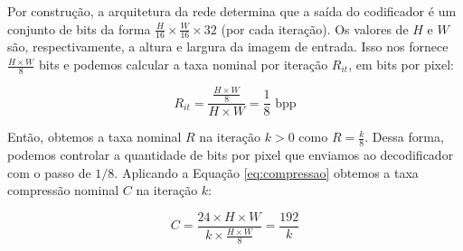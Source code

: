 Por construção, a arquitetura da rede determina que a saída do codificador é um conjunto de bits da forma $\frac{H}{16} \times \frac{W}{16} \times 32$ (por cada iteração). Os valores de $H$ e $W$ são, respectivamente, a altura e largura da imagem de entrada. Isso nos fornece $\frac{H \times W}{8}$ bits e podemos calcular a taxa nominal por iteração $R_{it}$, em bits por pixel:

\begin{equation}
\label{eq:bpp}
R_{it} = \frac{\frac{H \times W}{8}}{H \times W} =  \frac{1}{8}\text{ bpp} 
\end{equation}

Então, obtemos a taxa nominal $R$ na iteração $k>0$ como $R =\frac{k}{8} $.  Dessa forma, podemos controlar a quantidade de bits por pixel que enviamos ao decodificador com o passo de $1/8$. Aplicando a Equação \ref{eq:compressao} obtemos a taxa compressão nominal $C$ na iteração $k$: 

\begin{equation}
\label{eq:tc}
C = \frac{24 \times H \times W}{k \times \frac{H \times W}{8}} =  \frac{192}{k} 
\end{equation}



